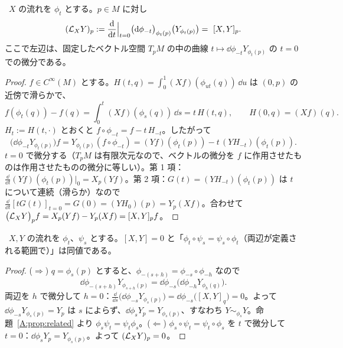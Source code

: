 \begin{thm}\label{A:thm:liederiv}
\tP\ $X$ の流れを $\phi_t$ とする。$p\in M$ に対し
\[
(\Lie_XY)_p:=\frac{\dd}{\dd t}\Big|_{t=0}\bigl(\dd\phi_{-t}\bigr)_{\phi_t(p)}\bigl(Y_{\phi_t(p)}\bigr)=\ [X,Y]_p .
\]
ここで左辺は、固定したベクトル空間 $T_pM$ の中の曲線 $t\mapsto\dd\phi_{-t}Y_{\phi_t(p)}$ の $t=0$ での微分である。
\end{thm}
\begin{proof}
$f\in C^\infty(M)$ とする。$H(t,q)=\int_0^1(Xf)(\phi_{ut}(q))\,\dd u$ は $(0,p)$ の近傍で滑らかで、
\[
f(\phi_t(q))-f(q)=\int_0^t(Xf)(\phi_s(q))\,\dd s=t\,H(t,q),\qquad H(0,q)=(Xf)(q).
\]
$H_t:=H(t,\cdot)$ とおくと $f\circ\phi_{-t}=f-t\,H_{-t}$。したがって
\[
\bigl(\dd\phi_{-t}Y_{\phi_t(p)}\bigr)f=Y_{\phi_t(p)}(f\circ\phi_{-t})=(Yf)(\phi_t(p))-t\,(YH_{-t})(\phi_t(p)).
\]
$t=0$ で微分する（$T_pM$ は有限次元なので、ベクトルの微分を $f$ に作用させたものは作用させたものの微分に等しい）。第 1 項：$\frac{\dd}{\dd t}(Yf)(\phi_t(p))|_0=X_p(Yf)$。第 2 項：$G(t)=(YH_{-t})(\phi_t(p))$ は $t$ について連続（滑らか）なので $\frac{\dd}{\dd t}[tG(t)]_{t=0}=G(0)=(YH_0)(p)=Y_p(Xf)$。合わせて $\bigl(\mathcal L_XY\bigr)_pf=X_p(Yf)-Y_p(Xf)=[X,Y]_pf$。
\end{proof}

\begin{cor}[可換性]\label{A:cor:commute}
\tP\ $X,Y$ の流れを $\phi_t$、$\psi_s$ とする。$[X,Y]=0$ と「$\phi_t\circ\psi_s=\psi_s\circ\phi_t$（両辺が定義される範囲で）」は同値である。
\end{cor}
\begin{proof}
($\Rightarrow$) $q=\phi_s(p)$ とすると、$\phi_{-(s+h)}=\phi_{-s}\circ\phi_{-h}$ なので
\[
\dd\phi_{-(s+h)}Y_{\phi_{s+h}(p)}=\dd\phi_{-s}\bigl(\dd\phi_{-h}Y_{\phi_h(q)}\bigr).
\]両辺を $h$ で微分して $h=0$：$\frac{\dd}{\dd s}\bigl(\dd\phi_{-s}Y_{\phi_s(p)}\bigr)=\dd\phi_{-s}\bigl([X,Y]_q\bigr)=0$。よって $\dd\phi_{-s}Y_{\phi_s(p)}=Y_p$ は $s$ によらず、$\dd\phi_sY_p=Y_{\phi_s(p)}$、すなわち $Y\sim_{\phi_s}Y$。命題~\ref{A:prop:related} より $\phi_s\psi_t=\psi_t\phi_s$。($\Leftarrow$) $\phi_s\circ\psi_t=\psi_t\circ\phi_s$ を $t$ で微分して $t=0$：$\dd\phi_sY_p=Y_{\phi_s(p)}$。よって $(\mathcal L_XY)_p=0$。
\end{proof}

